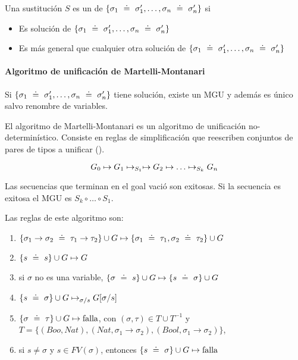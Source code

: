 Una sustitución $S$ es un  de $\{\sigma_1 \uni \sigma_1', \dots, \sigma_n \uni \sigma_n'\}$ si
\begin{itemize}
  \item Es solución de $\{\sigma_1 \uni \sigma_1', \dots, \sigma_n \uni \sigma_n'\}$
  \item Es más general que cualquier otra solución de $\{\sigma_1 \uni \sigma_1', \dots, \sigma_n \uni \sigma_n'\}$
\end{itemize}

\paragraph{Algoritmo de unificación de Martelli-Montanari}

\begin{teo}
  Si $\{\sigma_1 \uni \sigma_1', \dots, \sigma_n \uni \sigma_n'\}$ tiene solución, existe un MGU y además es único salvo renombre de variables.
\end{teo}

El algoritmo de Martelli-Montanari es un algoritmo de unificación no-determinístico. Consiste en reglas de simplificación que reescriben conjuntos de pares de tipos a unificar ().

\[G_0 \unito G_1 \unito_{S_1} \unito G_2 \unito \dots \unito_{S_k} G_n\]

Las secuencias que terminan en el goal vació son exitosas. Si la secuencia es exitosa el MGU es $S_k \circ \dots \circ S_1$.

Las reglas de este algoritmo son:

\begin{enumerate}
  \item {} $\{\sigma_1\to\sigma_2 \uni \tau_1\to\tau_2\} \cup G \unito \{\sigma_1 \uni \tau_1, \sigma_2 \uni \tau_2\} \cup G$
  \item {} $\{s \uni s\} \cup G \unito G$
  \item {} si $\sigma$ no es una variable, $\{\sigma \uni s\} \cup G \unito \{s \uni \sigma\} \cup G$
  \item {} $\{s \uni \sigma\} \cup G \unito_{\sigma/s} G[\sigma/s]$
  \item {} $\{\sigma \uni \tau\} \cup G \unito \text{falla}$, con $(\sigma, \tau) \in T \cup T^{-1}$ y $T = \{(Boo, Nat), (Nat, \sigma_1 \to \sigma_2), (Bool, \sigma_1 \to \sigma_2)\}$,
  \item {} si $s \neq \sigma$ y $s \in FV(\sigma)$, entonces $\{s \uni \sigma\} \cup G \unito \text{falla}$
\end{enumerate}

